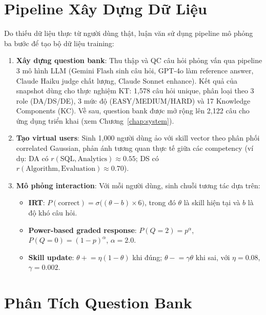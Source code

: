 \section{Pipeline Xây Dựng Dữ Liệu}
\label{sec:data_pipeline}

Do thiếu dữ liệu thực từ người dùng thật, luận văn sử dụng pipeline mô phỏng ba bước để tạo bộ dữ liệu training:

\begin{enumerate}
  \item \textbf{Xây dựng question bank}: Thu thập và QC câu hỏi phỏng vấn qua pipeline 3 mô hình LLM (Gemini Flash sinh câu hỏi, GPT-4o làm reference answer, Claude Haiku judge chất lượng, Claude Sonnet enhance). Kết quả của snapshot dùng cho thực nghiệm KT: 1{,}578 câu hỏi unique, phân loại theo 3 role (DA/DS/DE), 3 mức độ (EASY/MEDIUM/HARD) và 17 Knowledge Components (KC). Về sau, question bank được mở rộng lên 2{,}122 câu cho ứng dụng triển khai (xem Chương~\ref{chap:system}).

  \item \textbf{Tạo virtual users}: Sinh 1{,}000 người dùng ảo với skill vector theo phân phối correlated Gaussian, phản ánh tương quan thực tế giữa các competency (ví dụ: DA có $r(\text{SQL}, \text{Analytics}) \approx 0.55$; DS có $r(\text{Algorithm}, \text{Evaluation}) \approx 0.70$).

  \item \textbf{Mô phỏng interaction}: Với mỗi người dùng, sinh chuỗi tương tác dựa trên:
  \begin{itemize}
    \item \textbf{IRT}: $P(\text{correct}) = \sigma\bigl((\theta - b) \times 6\bigr)$, trong đó $\theta$ là skill hiện tại và $b$ là độ khó câu hỏi.
    \item \textbf{Power-based graded response}: $P(Q=2) = p^{\alpha}$, $P(Q=0) = (1-p)^{\alpha}$, $\alpha = 2.0$.
    \item \textbf{Skill update}: $\theta \mathrel{+}= \eta(1 - \theta)$ khi đúng; $\theta \mathrel{-}= \gamma\theta$ khi sai, với $\eta = 0.08$, $\gamma = 0.002$.
  \end{itemize}
\end{enumerate}

\section{Phân Tích Question Bank}
\label{sec:eda_qbank}


